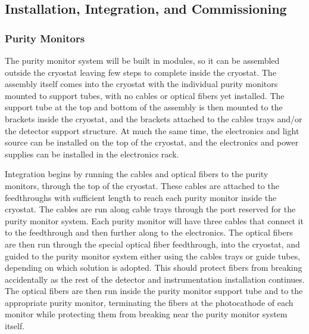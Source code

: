 \subsection{Installation, Integration, and Commissioning}


\subsubsection{Purity Monitors}
\label{sec:fdgen-slow-cryo-install-pm}


The purity monitor system will be built in modules, so it can be assembled outside the %
cryostat  
leaving few steps to complete inside the cryostat.  The assembly itself %
 comes into the cryostat with the individual purity monitors mounted to support tubes, with no  cables or optical fibers yet installed.  The support tube at the top and bottom of the assembly %
 is then mounted to the brackets inside the cryostat, and  %
 the brackets attached to the cables trays and/or the detector support structure.  At much the same time, the  electronics and light source can be installed on the top of the cryostat, and the electronics and power supplies can be installed in the electronics rack.  

Integration %
begins by running the   cables and optical fibers to the purity monitors, through the top of the cryostat.  These cables %
are attached to the    feedthroughs with sufficient length to reach each purity monitor inside the cryostat.  
The cables %
are run along cable trays through the port reserved for the purity monitor system. 
Each purity monitor will have three   cables that connect it to the feedthrough and then further along to the   electronics.  The optical fibers %
are then run through the special optical fiber feedthrough, into the cryostat, and %
guided to the purity monitor system either using the cables trays or guide tubes, depending on which solution is adopted. 
This should protect fibers from breaking accidentally as the rest of the detector and instrumentation installation continues.  The optical fibers %
are then run inside the purity monitor support tube and to the appropriate purity monitor, terminating the fibers at the photocathode of each monitor while protecting them from breaking near the purity monitor system itself.

